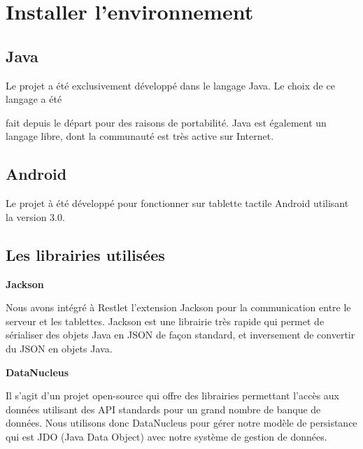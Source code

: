 \documentclass{article}
\begin{document}
\section*{{\LARGE {\color{color01} \textbf{Installer l'environnement\label{h.9koebhiq5beh}}}}}

\vspace{18pt}
\subsection*{{\large {\color{color01} \textbf{Java}}}}

{\color{color01} Le projet a été exclusivement développé dans le langage Java. 
Le choix de ce langage a été}

{\color{color01} fait depuis le départ pour des raisons de portabilité. Java 
est également un langage libre, dont la communauté est très active sur Internet.\label{h.1fkabj68oiz3}}

\vspace{18pt}
\subsection*{{\large {\color{color01} \textbf{Android}}}}

{\color{color01} Le projet à été développé pour fonctionner sur tablette tactile 
Android utilisant la version 3.0. \label{h.z07mtcu37998}}

\vspace{18pt}
\subsection*{{\large {\color{color01} \textbf{Les librairies utilisées}}}}

\leftskip=36pt
\parindent=-18pt
{\color{color01} \textbf{Jackson}}

\leftskip=0pt
\parindent=0pt
{\color{color01} Nous avons intégré à Restlet l'extension Jackson pour la communication 
entre le serveur et les tablettes. Jackson est une librairie très rapide qui permet 
de sérialiser des objets Java en JSON de façon standard, et inversement de convertir 
du JSON en objets Java.}

\leftskip=36pt
\parindent=-18pt
{\color{color01} \textbf{DataNucleus  }}

\leftskip=0pt
\parindent=0pt
{\color{color01} Il s'agit d'un projet open-source qui offre des librairies permettant 
l'accès aux données utilisant des API standards pour un grand nombre de banque 
de données. Nous utilisons donc DataNucleus pour gérer notre modèle de persistance 
qui est JDO (Java Data Object) avec notre système de gestion de données.}
\end{document}
